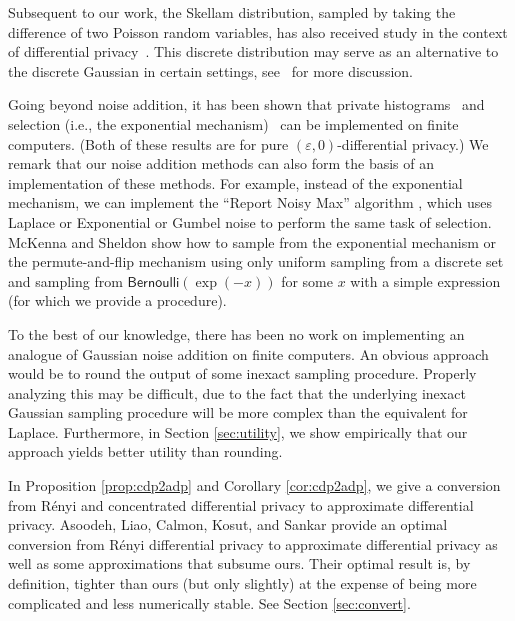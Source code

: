 \documentclass{jpcfinal} %
\newcommand{\eps}{\varepsilon}
\newcommand{\bern}{\mathsf{Bernoulli}}
\begin{document}
Subsequent to our work, the Skellam distribution, sampled by taking the difference of two Poisson random variables, has also received study in the context of differential privacy~\cite{AgarwalKL21,bao2022distributed}.
This discrete distribution may serve as an alternative to the discrete Gaussian in certain settings, see~\cite{AgarwalKL21} for more discussion.

Going beyond noise addition, it has been shown that private histograms~\citep{BalcerV17} and selection (i.e., the exponential mechanism)~\citep{Ilvento19} can be implemented on finite computers. (Both of these results are for pure $(\eps,0)$-differential privacy.)
We remark that our noise addition methods can also form the basis of an implementation of these methods. For example, instead of the exponential mechanism, we can implement the ``Report Noisy Max'' algorithm \citep{DworkR14}, which uses Laplace or Exponential \citep{McKennaS20} or Gumbel \citep{Gumbel} noise to perform the same task of selection. McKenna and Sheldon \cite{McKennaS20} show how to sample from the exponential mechanism or the permute-and-flip mechanism using only uniform sampling from a discrete set and sampling from $\bern(\exp(-x))$ for some $x$ with a simple expression (for which we provide a procedure).

To the best of our knowledge, there has been no work on implementing an analogue of Gaussian noise addition on finite computers. An obvious approach would be to round the output of some inexact sampling procedure. Properly analyzing this may be difficult, due to the fact that the underlying inexact Gaussian sampling procedure will be more complex than the equivalent for Laplace. Furthermore, in Section \ref{sec:utility}, we show empirically that our approach yields better utility than rounding.





In Proposition \ref{prop:cdp2adp} and Corollary \ref{cor:cdp2adp}, we give a conversion from R\'enyi and concentrated differential privacy to approximate differential privacy. Asoodeh, Liao, Calmon, Kosut, and Sankar \cite{AsoodehLCKS20} provide an optimal conversion from R\'enyi differential privacy to approximate differential privacy as well as some approximations that subsume ours. Their optimal result is, by definition, tighter than ours (but only slightly) at the expense of being more complicated and less numerically stable. See Section \ref{sec:convert}.
\end{document}
